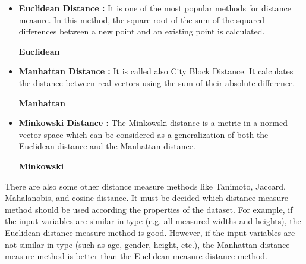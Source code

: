 \begin{itemize}

\item \textbf{Euclidean Distance : }It is one of the most popular methods for distance measure. In this method, the square root of the sum of the squared differences between a new point and an existing point is calculated.

  \begin{center}
  
\textbf{Euclidean} 

  \end{center}
  


\item \textbf{Manhattan Distance : }It is called also City Block Distance. It calculates the distance between real vectors using the sum of their absolute difference.

  \begin{center}
  
\textbf{Manhattan} 

  \end{center}
  

\item \textbf{Minkowski Distance : }The Minkowski distance is a metric in a normed vector space which can be considered as a generalization of both the Euclidean distance and the Manhattan distance.
  
  \begin{center}
  
\textbf{Minkowski} 

  \end{center}

\end{itemize}

There are also some other distance measure methods like Tanimoto, Jaccard, Mahalanobis, and cosine distance. It must be decided which distance measure method should be used according the properties of the dataset. For example, if the input variables are similar in type (e.g. all measured widths and heights), the Euclidean distance measure method is good. However, if the input variables are not similar in type (such as age, gender, height, etc.), the Manhattan distance measure method is better than the Euclidean measure distance method.



